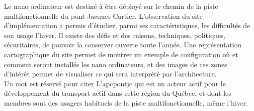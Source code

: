 ﻿\noindent Le nano ordinateur est destiné à être déployé sur le chemin de la piste multifonctionnelle du pont Jacques-Cartier. L'observation du site d'implémentation a permis d'étudier, parmi ses caractéristiques, les difficultés de son usage l'hiver. Il existe des défis et des raisons, techniques, politiques, sécuritaires, de pouvoir la conserver ouverte toute l'année. Une représentation cartographique du site permet de montrer un exemple de configuration où et comment seront installés les nano ordinateurs, et des images de ces zones d'intérêt permet de visualiser ce qui sera interprété par l'architecture. 
\vspace{\baselineskip}
\\
\noindent Un mot est réservé pour citer L'\acrlong{apcpontjc} qui est un acteur actif pour le développement du transport actif dans cette région du Québec, et dont les membres sont des usagers habituels de la piste multifonctionnelle, même l'hiver.